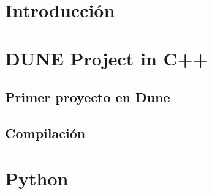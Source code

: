 \documentclass{scrarticle}
\begin{document}
\section{Introducción}

\section{DUNE Project in C++}
\subsection[Primer Proyecto]{Primer proyecto en Dune}

\subsection{Compilación}

\newpage
\section{Python}
\end{document}

